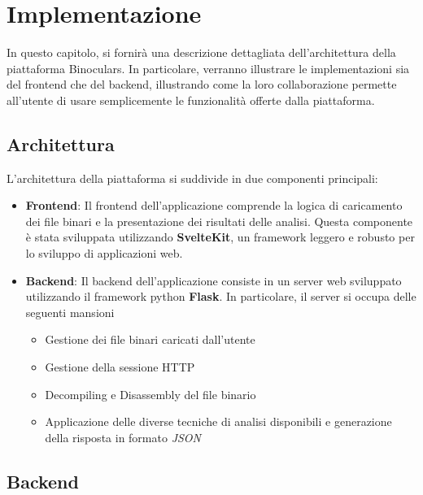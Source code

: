 \documentclass[../main.tex]{subfiles}
\begin{document}
\chapter{Implementazione}
In questo capitolo, si fornirà una descrizione dettagliata dell'architettura della piattaforma Binoculars.
In particolare, verranno illustrare le implementazioni sia del frontend che del backend,
illustrando come la loro collaborazione permette all'utente di usare semplicemente le funzionalità offerte dalla piattaforma.
\section{Architettura}
L'architettura della piattaforma si suddivide in due componenti principali:
\begin{itemize}
    \item \textbf{Frontend}: Il frontend dell'applicazione comprende la logica di caricamento dei file binari e la presentazione
    dei risultati delle analisi. Questa componente è stata sviluppata utilizzando \textbf{SvelteKit}, un framework leggero e robusto per lo sviluppo
    di applicazioni web.
    \item \textbf{Backend}: Il backend dell'applicazione consiste in un server web sviluppato utilizzando il framework python \textbf{Flask}.
    In particolare, il server si occupa delle seguenti mansioni
    \begin{itemize}
        \item Gestione dei file binari caricati dall'utente
        \item Gestione della sessione HTTP
        \item Decompiling e Disassembly del file binario
        \item Applicazione delle diverse tecniche di analisi disponibili e generazione della risposta in formato \textit{JSON}
    \end{itemize}
\end{itemize}
\section{Backend}
\end{document}
